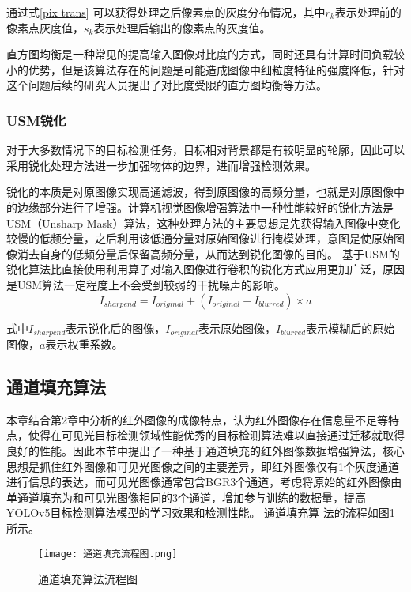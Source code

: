 通过式\ref{pix trans}
可以获得处理之后像素点的灰度分布情况，其中$r_{k}$表示处理前的像素点灰度值，$s_{k}$表示处理后输出的像素点的灰度值。

直方图均衡是一种常见的提高输入图像对比度的方式，同时还具有计算时间负载较小的优势，但是该算法存在的问题是可能造成图像中细粒度特征的强度降低，针对这个问题后续的研究人员提出了对比度受限的直方图均衡等方法。

\subsubsection{USM锐化}
对于大多数情况下的目标检测任务，目标相对背景都是有较明显的轮廓，因此可以采用锐化处理方法进一步加强物体的边界，进而增强检测效果。

锐化的本质是对原图像实现高通滤波，得到原图像的高频分量，也就是对原图像中的边缘部分进行了增强。计算机视觉图像增强算法中一种性能较好的锐化方法是USM（Unsharp Mask）算法，这种处理方法的主要思想是先获得输入图像中变化较慢的低频分量，之后利用该低通分量对原始图像进行掩模处理，意图是使原始图像消去自身的低频分量后保留高频分量，从而达到锐化图像的目的。
基于USM的锐化算法比直接使用利用算子对输入图像进行卷积的锐化方式应用更加广泛，原因是USM算法一定程度上不会受到较弱的干扰噪声的影响。
\begin{equation}
  I_{sharpend}=I_{original}+(I_{original}-I_{blurred})\times {a}
\end{equation}

式中$I_{sharpend}$表示锐化后的图像，$I_{original}$表示原始图像，$I_{blurred}$表示模糊后的原始图像，$a$表示权重系数。

\subsection{通道填充算法}
本章结合第2章中分析的红外图像的成像特点，认为红外图像存在信息量不足等特点，使得在可见光目标检测领域性能优秀的目标检测算法难以直接通过迁移就取得良好的性能。因此本节中提出了一种基于通道填充的红外图像数据增强算法，核心思想是抓住红外图像和可见光图像之间的主要差异，即红外图像仅有1个灰度通道进行信息的表达，而可见光图像通常包含BGR3个通道，考虑将原始的红外图像由单通道填充为和可见光图像相同的3个通道，增加参与训练的数据量，提高YOLOv5目标检测算法模型的学习效果和检测性能。
通道填充算
法的流程如图\ref{tdtc}所示。

\begin{figure}[h]
  \centering
  \texttt{[image: 通道填充流程图.png]}
  \caption{通道填充算法流程图}
  \label{tdtc}
\end{figure}

